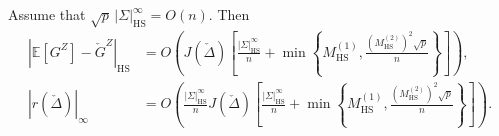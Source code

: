 \documentclass[EJP, preprint, NODS, nobera, nofontexpansion]{ejpecp}
\DeclareMathOperator{\hs}{HS}
\begin{document}
\begin{proposition}
\label{pro:interaction_controlled_check_pivot}
Assume that $\sqrt p\,|\Sigma|_{\hs}^\infty=O(n)$. Then
\begin{align}
 |\mathbb E[G^Z]-\check G^Z|_{\hs}
 &=O\left(J(\check\Delta)\left[
 \frac{|\Sigma|_{\hs}^\infty}n
 +\min\left\{
   M_{\hs}^{(1)},
   \frac{(M_{\hs}^{(2)})^2\sqrt p}{n}
 \right\}\right]\right),
 \label{eq:interaction_check_bias}\\
 |r(\check\Delta)|_\infty
 &=O\left(\frac{|\Sigma|_{\hs}^\infty}nJ(\check\Delta)\left[
 \frac{|\Sigma|_{\hs}^\infty}n
 +\min\left\{
   M_{\hs}^{(1)},
   \frac{(M_{\hs}^{(2)})^2\sqrt p}{n}
 \right\}\right]\right).
 \label{eq:interaction_check_defect}
\end{align}
\end{proposition}
\end{document}
